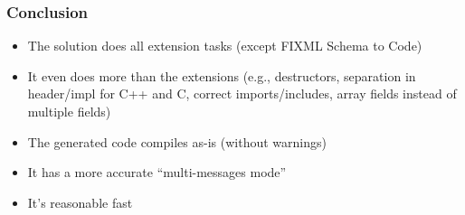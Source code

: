 \documentclass{beamer}
\begin{document}
\begin{frame}
  \frametitle{Conclusion}
  \begin{itemize}
  \item The solution does all extension tasks (except FIXML Schema to Code)
  \item It even does more than the extensions (e.g., destructors, separation in
    header/impl for C++ and C, correct imports/includes, array fields instead
    of multiple fields)
  \item The generated code compiles as-is (without warnings)
  \item It has a more accurate ``multi-messages mode''
  \item It's reasonable fast
  \end{itemize}
\end{frame}
\end{document}
